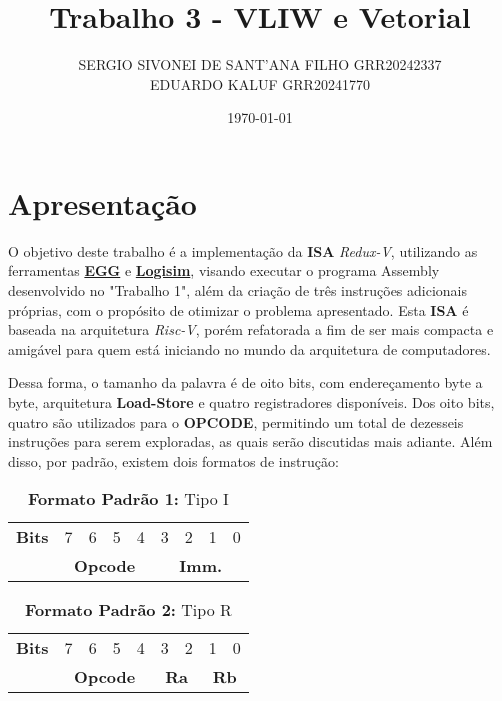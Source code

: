 \documentclass{article}  %
\title{Trabalho 3 - VLIW e Vetorial}
\author{SERGIO SIVONEI DE SANT'ANA FILHO GRR20242337\\EDUARDO KALUF GRR20241770}
\date{\today}
\begin{document}
    \maketitle
    
    \section{Apresentação}
    
    \setlength{\parindent}{15pt}

    O objetivo deste trabalho é a implementação da \textbf{ISA} \textit{Redux-V}, utilizando as ferramentas \href{https://github.com/gboncoffee/egg}{\textbf{EGG}} e \href{https://github.com/logisim-evolution/logisim-evolution}{\textbf{Logisim}}, visando executar o programa Assembly desenvolvido no "Trabalho 1", além da criação de três instruções adicionais próprias, com o propósito de otimizar o problema apresentado.
    Esta \textbf{ISA} é baseada na arquitetura \textit{Risc-V}, porém refatorada a fim de ser mais compacta e amigável para quem está iniciando no mundo da arquitetura de computadores.
    
    Dessa forma, o tamanho da palavra é de oito bits, com endereçamento byte a byte, arquitetura \textbf{Load-Store} e quatro registradores disponíveis.
    Dos oito bits, quatro são utilizados para o \textbf{OPCODE}, permitindo um total de dezesseis instruções para serem exploradas, as quais serão discutidas mais adiante. Além disso, por padrão, existem dois formatos de instrução:

    \begin{table}[h]
      \captionsetup{labelformat=empty, skip=0pt}
      \caption{\textbf{Formato Padrão 1:} Tipo I}
      \centering
      \begin{tabular}{|c|*{8}{c|}}
        \hline
        \rowcolor{green!50}
        \multicolumn{9}{|c|}{\textbf{Tipo I}} \\ \hline
        \textbf{Bits} & 7 & 6 & 5 & 4 & 3 & 2 & 1 & 0 \\ \hline
        & \multicolumn{4}{c|}{\textbf{Opcode}} & \multicolumn{4}{c|}{\textbf{Imm.}} \\ \hline
      \end{tabular}
    \end{table}

    \begin{table}[h]
      \captionsetup{labelformat=empty, skip=0pt}
      \caption{\textbf{Formato Padrão 2:} Tipo R}
      \centering
      \begin{tabular}{|c|*{8}{c|}}
        \hline
        \rowcolor{blue!50}
        \multicolumn{9}{|c|}{\textbf{Tipo R}} \\ \hline
        \textbf{Bits} & 7 & 6 & 5 & 4 & 3 & 2 & 1 & 0 \\ \hline
        & \multicolumn{4}{c|}{\textbf{Opcode}} & \multicolumn{2}{c|}{\textbf{Ra}} & \multicolumn{2}{c|}{\textbf{Rb}} \\ \hline
      \end{tabular}
    \end{table}
\end{document}
